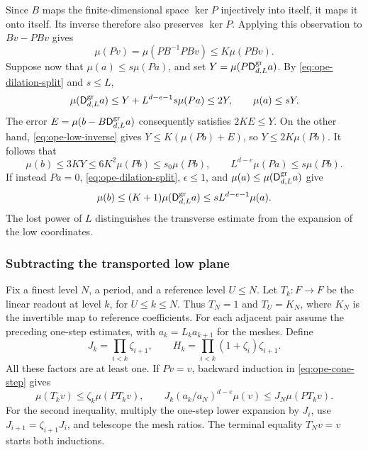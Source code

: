 Since $B$ maps the finite-dimensional space $\ker P$ injectively into
itself, it maps it onto itself. Its inverse therefore also preserves
$\ker P$. Applying this observation to $Bv-PBv$ gives
\begin{equation}\label{eq:ope-low-inverse}
 \mu(Pv)=\mu(PB^{-1}PBv)\leq K\mu(PBv).
\end{equation}
Suppose now that $\mu(a)\leq s\mu(Pa)$, and set $Y=\mu(P\mathsf D^{\rm gr}_{d,L}a)$.
By \eqref{eq:ope-dilation-split} and $s\leq L$,
\[
 \mu(\mathsf D^{\rm gr}_{d,L}a)\leq Y+L^{d-e-1}s\mu(Pa)\leq2Y,
 \qquad \mu(a)\leq sY.
\]
The error $E=\mu(b-B\mathsf D^{\rm gr}_{d,L}a)$ consequently satisfies
$2KE\leq Y$. On the other hand, \eqref{eq:ope-low-inverse} gives
$Y\leq K(\mu(Pb)+E)$, so $Y\leq2K\mu(Pb)$. It follows that
\begin{equation}\label{eq:ope-cone-step}
 \mu(b)\leq3KY\leq6K^2\mu(Pb)\leq s_0\mu(Pb),\qquad
 L^{d-e}\mu(Pa)\leq s\mu(Pb).
\end{equation}
If instead $Pa=0$, \eqref{eq:ope-dilation-split}, $\epsilon\leq1$,
and $\mu(a)\leq\mu(\mathsf D^{\rm gr}_{d,L}a)$ give
\begin{equation}\label{eq:ope-transverse-step}
 \mu(b)\leq(K+1)\mu(\mathsf D^{\rm gr}_{d,L}a)
       \leq sL^{d-e-1}\mu(a).
\end{equation}
The lost power of $L$ distinguishes the transverse estimate from the
expansion of the low coordinates.

\subsubsection{Subtracting the transported low plane}
Fix a finest level $N$, a period, and a reference level $U\leq N$.
Let $T_k:F\to F$ be the linear readout at level $k$, for $U\leq k\leq N$.
Thus $T_N=1$ and $T_U=K_N$, where $K_N$ is the invertible map to
reference coefficients. For each adjacent pair assume the preceding
one-step estimates, with $a_k=L_ka_{k+1}$ for the meshes. Define
\[
 J_k=\prod_{i<k}\zeta_{i+1},\qquad
 H_k=\prod_{i<k}(1+\zeta_i)\zeta_{i+1}.
\]
All these factors are at least one. If $Pv=v$, backward induction in
\eqref{eq:ope-cone-step} gives
\begin{equation}\label{eq:ope-plane-expansion}
 \mu(T_kv)\leq\zeta_k\mu(PT_kv),\qquad
 J_k(a_k/a_N)^{d-e}\mu(v)\leq J_N\mu(PT_kv).
\end{equation}
For the second inequality, multiply the one-step lower expansion by
$J_i$, use $J_{i+1}=\zeta_{i+1}J_i$, and telescope the mesh ratios.
The terminal equality $T_Nv=v$ starts both inductions.

